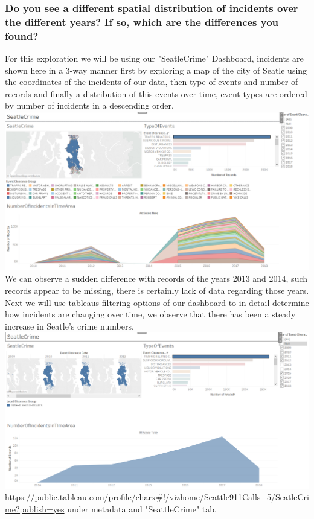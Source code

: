 \documentclass{article}
\begin{document}
    \subsubsection {Do you	see	a	different	spatial	distribution	of	incidents	over	the	different	years?	If	so,	which	are	the	differences	you	found?}
        For this exploration we will be using our "SeatleCrime" Dashboard, incidents are shown here in a 3-way manner first by exploring a map of the city of Seatle using the coordinates of the incidents of our data, then type of events and number of records and finally a distribution of this events over time, event types are ordered by number of incidents in a descending order.
        \\
        \includegraphics[width=\textwidth]{VisualAnalytics/Assignment2/images/SpatialDistDashboard1.PNG}
        \\
        We can observe a sudden difference with records of the years 2013 and 2014, such records appear to be missing, there is certainly lack of data regarding those years. Next we will use tableaus filtering options of our dashboard to in detail determine how incidents are changing over time, we observe that there has been a steady increase in Seatle's crime numbers, 
        \\
        \includegraphics[width=\textwidth]{VisualAnalytics/Assignment2/images/SpatialDistDashboard2.PNG}
        \\
        \url{https://public.tableau.com/profile/charx#!/vizhome/Seattle911Calls_5/SeatleCrime?publish=yes} under metadata and "SeattleCrime" tab.
\end{document}

